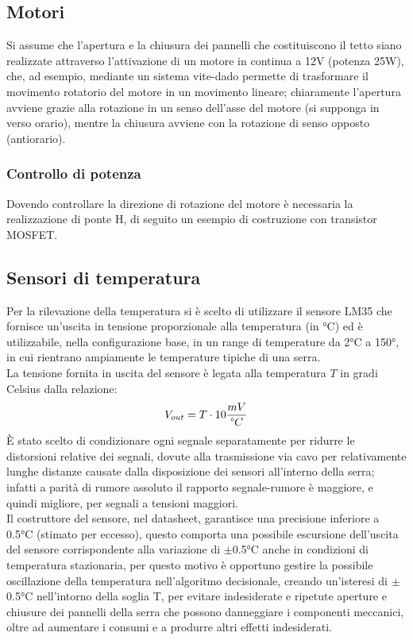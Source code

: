 \documentclass[12pt]{article}
\begin{document}
    \subsection{Motori}
    Si assume che l'apertura e la chiusura dei pannelli che costituiscono il tetto siano realiz\-zate attraverso l'attivazione di un motore in continua a 12V (potenza 25W), che, ad esempio, mediante un sistema vite-dado permette di trasformare il movimento rotatorio del motore in un movimento lineare; chiaramente l'apertura avviene grazie alla rotazione in un senso dell'asse del motore (si supponga in verso orario), mentre la chiusura avviene con la rotazione di senso opposto (antiorario).
        \subsubsection{Controllo di potenza}
        Dovendo controllare la direzione di rotazione del motore è necessaria la realizzazione di ponte H, di seguito un esempio di costruzione con transistor MOSFET.\\

        \vspace{0.1cm}


    \subsection{Sensori di temperatura}
    Per la rilevazione della temperatura si è scelto di utilizzare il sensore LM35 che fornisce un'uscita in tensione proporzionale alla temperatura (in °C) ed è utilizzabile, nella con\-fi\-gu\-ra\-zio\-ne base, in un range di temperature da 2°C a 150°, in cui rientrano ampiamente le temperature tipiche di una serra.\\
    La tensione fornita in uscita del sensore è legata alla temperatura $T$ in gradi Celsius dalla relazione:
    \begin{equation}
        V_{out} = T \cdot 10 \frac{mV}{\degree C}
    \end{equation}
    È stato scelto di condizionare ogni segnale separatamente per ridurre le distorsioni re\-la\-ti\-ve dei segnali, dovute alla trasmissione via cavo per relativamente lunghe distanze causate dalla disposizione dei sensori all'interno della serra; infatti a parità di rumore assoluto il rapporto segnale-rumore è maggiore, e quindi migliore, per segnali a tensioni maggiori.\\
    Il costruttore del sensore, nel datasheet, garantisce una precisione inferiore a 0.5°C (sti\-ma\-to per eccesso), questo comporta una possibile escursione dell'uscita del sensore cor\-ris\-pon\-den\-te alla variazione di $\pm$0.5°C anche in condizioni di temperatura stazionaria, per questo motivo è opportuno gestire la possibile oscillazione della temperatura nell'al\-go\-rit\-mo decisionale, creando un'isteresi di $\pm$0.5°C nell'intorno della soglia T, per evitare indesiderate e ripetute aperture e chiusure dei pannelli della serra che possono dan\-neg\-gia\-re i componenti meccanici, oltre ad aumentare i consumi e a produrre altri effetti indesiderati.
    
\end{document}
